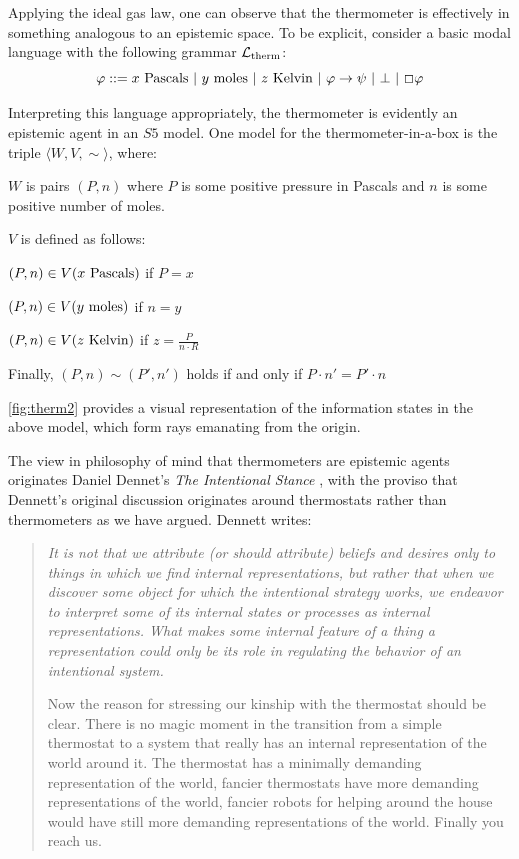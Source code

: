 \documentclass[11pt]{article}
\numberwithin{equation}{subsection}
\renewcommand{\phi}{\varphi}
\begin{document}
Applying the ideal gas law, one can observe that the thermometer is effectively
in something analogous to an epistemic space.  To be explicit,
consider a basic modal language with the following grammar \label{Ltherm}$\mathcal{L}_{\textup{therm}}$:
\[ \phi ::= x \textup{ Pascals}  \ |\ y \textup{ moles}  \ |\ z \textup{ Kelvin}  \ |\ \phi \to \psi \ |\ \bot \ |\ \Box \phi \]

Interpreting this language appropriately, the
thermometer is evidently an epistemic agent in an $S5$ model.
One model for the thermometer-in-a-box is the triple $\langle W, V, \sim \rangle$,
where:
\begin{bul}
	\item $W$ is pairs $(P,n)$ where $P$ is some positive pressure
          in Pascals and $n$ is some positive number of moles.
	\item $V$ is defined as follows:
	\begin{bul}
		\item $(P,n) \in V(x \textup{\ Pascals})$ if $P = x$
		\item $(P,n) \in V(y \textup{\ moles})$ if $n = y$
		\item $(P,n) \in V(z \textup{\ Kelvin})$ if $z = \frac{P}{n \cdot R}$
	\end{bul}
	\item Finally, $(P,n) \sim (P',n')$ holds if and only if $P \cdot n' = P' \cdot n$ 
\end{bul}
\ref{fig:therm2} provides a visual representation of the information
states in the above model, which form rays emanating from the origin.

The view in philosophy of mind that thermometers are epistemic agents 
originates Daniel Dennet's \emph{The Intentional Stance}
\citep{dennett_intentional_1998}, 
with the proviso that Dennett's
original discussion originates around thermostats rather than 
thermometers as we have argued.  Dennett writes:
\begin{quote}
\emph{It is not that we attribute (or should attribute) beliefs and desires only to
things in which we find internal representations, but rather that when we
discover some object for which the intentional strategy works, we endeavor to
interpret some of its internal states or processes as internal representations.
What makes some internal feature of a thing a representation could only be its
role in regulating the behavior of an intentional system.}

Now the reason for stressing our kinship with the thermostat
should be clear. There is no magic moment in the transition from a
simple thermostat to a system that really has an internal representation
of the world around it. The thermostat has a minimally demanding
representation of the world, fancier thermostats have more demanding 
representations of the world, fancier robots for helping around
the house would have still more demanding representations of the
world. Finally you reach us.
\end{quote}
\end{document}
